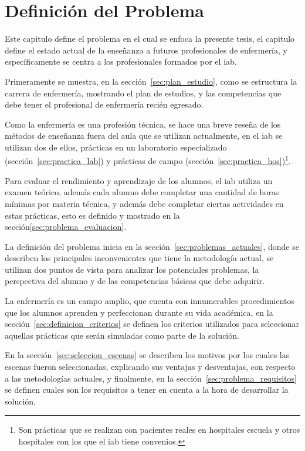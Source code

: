 \chapter{Definición del Problema}

Este capitulo define el problema en el cual se enfoca la presente tesis, el
capitulo define el estado actual de la enseñanza a futuros profesionales de
enfermería, y específicamente se centra a los profesionales formados por el
\Gls{iab}. 

Primeramente se muestra, en la sección~\ref{sec:plan_estudio}, como se
estructura la carrera de enfermería, mostrando el plan de estudios, y las
competencias que debe tener el profesional de enfermería recién egresado.

Como la enfermería es una profesión técnica, se hace una breve reseña de los
métodos de enseñanza fuera del aula que se utilizan actualmente, en el \Gls{iab}
se utilizan dos de ellos, prácticas en un laboratorio especializado
(sección~\ref{sec:practica_lab}) y prácticas de campo
(sección~\ref{sec:practica_hos})\footnote{Son prácticas que se realizan con
    pacientes reales en hospitales escuela y otros hospitales con los que el
    \Gls{iab} tiene convenios.}.

Para evaluar el rendimiento y aprendizaje de los alumnos, el \Gls{iab} utiliza
un examen teórico, además cada alumno debe completar una cantidad de horas
mínimas por materia técnica, y además debe completar ciertas actividades en
estas prácticas, esto es definido y mostrado en la
sección\ref{sec:problema_evaluacion}.

La definición del problema inicia en la sección~\ref{sec:problemas_actuales},
donde se describen los principales inconvenientes que tiene la metodología
actual, se utilizan dos puntos de vista para analizar los potenciales problemas,
la perspectiva del alumno y de las competencias básicas que debe adquirir.


La enfermería es un campo amplio, que cuenta con innumerables procedimientos que
los alumnos aprenden y perfeccionan durante su vida académica, en la
sección~\ref{sec:definicion_criterios} se definen los criterios utilizados para
seleccionar aquellas prácticas que serán simuladas como parte de la solución.

En la sección~\ref{sec:seleccion_escenas} se describen los motivos por los
cuales las escenas fueron seleccionadas, explicando sus ventajas y desventajas,
con respecto a las metodologías actuales, y finalmente, en la
sección~\ref{sec:problema_requisitos} se definen cuales son los requisitos a
tener en cuenta a la hora de desarrollar la solución.









